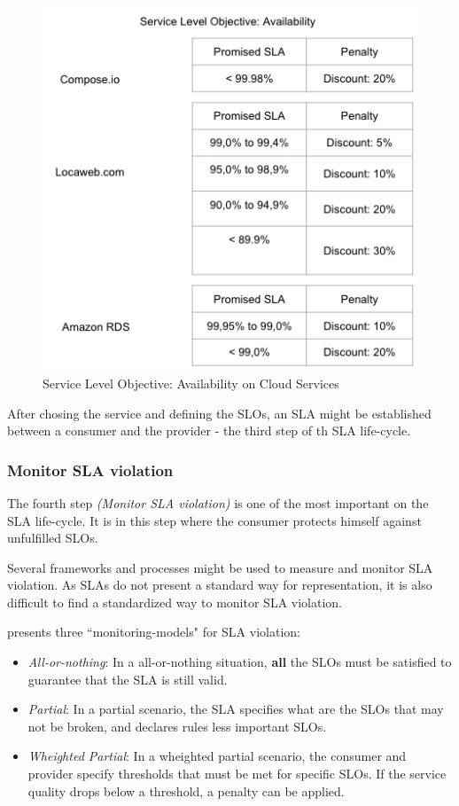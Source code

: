 \begin{figure}[ht!]
\centering
\includegraphics[width=120mm]{slo-cloudServices.png}
\caption{Service Level Objective: Availability on Cloud Services \cite{locawebsla}\cite{composesla}\cite{amazonrdssla}}\label{fig:sla-agreement}
\end{figure}

After chosing the service and defining the SLOs, an SLA might be established between a consumer and the provider - the third step of th SLA life-cycle. 

\subsubsection{Monitor SLA violation}
The fourth step \textit{(Monitor SLA violation)} is one of the most important on the SLA life-cycle. It is in this step where the consumer protects himself against unfulfilled SLOs. 

Several frameworks and processes might be used to measure and monitor SLA violation. As SLAs do not present a standard way for representation, it is also difficult to find a standardized way to monitor SLA violation. 

\cite{ranna2008} presents three ``monitoring-models" for SLA violation: 

\begin{itemize}
   \item{\textit{All-or-nothing}: In a all-or-nothing situation, \textbf{all} the SLOs must be satisfied to guarantee that the SLA is still valid.}
   \item{\textit{Partial}: In a partial scenario, the SLA specifies what are the SLOs that may not be broken, and declares rules less important SLOs.}
   \item{\textit{Wheighted Partial}: In a wheighted partial scenario, the consumer and provider specify thresholds that must be met for specific SLOs. If the service quality drops below a threshold, a penalty can be applied. 
}

\end{itemize}

